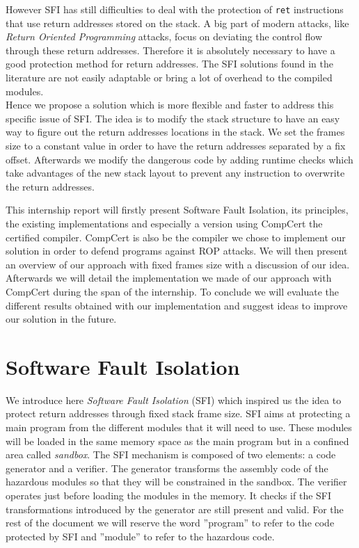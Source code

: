 \documentclass[11pt]{sdm}
\begin{document}
However SFI has still difficulties to deal with the protection of \texttt{ret} instructions that use return addresses stored on the stack. A big part of modern attacks, like \textit{Return Oriented Programming} attacks, focus on deviating the control flow through these return addresses. Therefore it is absolutely necessary to have a good protection method for return addresses. The SFI solutions found in the literature are not easily adaptable or bring a lot of overhead to the compiled modules. \\
Hence we propose a solution which is more flexible and faster to address this specific issue of SFI.
The idea is to modify the stack structure to have an easy way to figure out the return addresses locations in the stack.
We set the frames size to a constant value in order to have the return addresses separated by a fix offset. Afterwards we modify the dangerous code by adding runtime checks which take advantages of the new stack layout to prevent any instruction to overwrite the return addresses. 

This internship report will firstly present Software Fault Isolation, its principles, the existing implementations and especially a version using CompCert the certified compiler. CompCert is also be the compiler we chose to implement our solution in order to defend programs against ROP attacks. We will then present an overview of our approach with fixed frames size with a discussion of our idea. Afterwards we will detail the implementation we made of our approach with CompCert during the span of the internship. To conclude we will evaluate the different results obtained with our implementation and suggest ideas to improve our solution in the future.


\newpage
\section{Software Fault Isolation}
\label{sec:sfi}

	We introduce here \textit{Software Fault Isolation} (SFI) which inspired us the idea to protect return addresses through fixed stack frame size. SFI aims at protecting a main program from the different modules that it will need to use. These modules will be loaded in the same memory space as the main program but in a confined area called \textit{sandbox}. The SFI mechanism is composed of two elements: a code generator and a verifier. The generator transforms the assembly code of the hazardous modules so that they will be constrained in the sandbox. The verifier operates just before loading the modules in the memory. It checks if the SFI transformations introduced by the generator are still present and valid. For the rest of the document we will reserve the word ''program'' to refer to the code protected by SFI and ''module'' to refer to the hazardous code.
\end{document}
